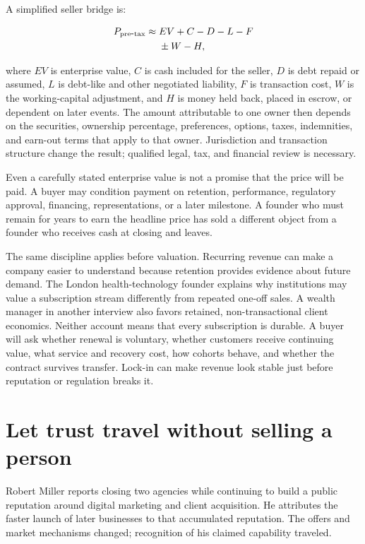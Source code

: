 A simplified seller bridge is:

\begin{align}
P_{\mathrm{pre\mbox{-}tax}} \approx{}& EV + C - D - L - F \notag\\
&{}\pm W - H,
\end{align}

where \(EV\) is enterprise value, \(C\) is cash included for the seller,
\(D\) is debt repaid or assumed, \(L\) is debt-like and other negotiated
liability, \(F\) is transaction cost, \(W\) is the working-capital adjustment,
and \(H\) is money held back, placed in escrow, or dependent on later events.
The amount attributable to one owner then depends on the securities, ownership
percentage, preferences, options, taxes, indemnities, and earn-out terms that
apply to that owner. Jurisdiction and transaction structure change the result;
qualified legal, tax, and financial review is necessary.

Even a carefully stated enterprise value is not a promise that the price will
be paid. A buyer may condition payment on retention, performance, regulatory
approval, financing, representations, or a later milestone. A founder who must
remain for years to earn the headline price has sold a different object from a
founder who receives cash at closing and leaves.

The same discipline applies before valuation. Recurring revenue can make a
company easier to understand because retention provides evidence about future
demand. The London health-technology founder explains why institutions may
value a subscription stream differently from repeated one-off sales. A wealth
manager in another interview also favors retained, non-transactional client
economics. Neither account means that every subscription is durable. A buyer
will ask whether renewal is voluntary, whether customers receive continuing
value, what service and recovery cost, how cohorts behave, and whether the
contract survives transfer. Lock-in can make revenue look stable just before
reputation or regulation breaks it.

\section{Let trust travel without selling a person}

Robert Miller reports closing two agencies while continuing to build a public
reputation around digital marketing and client acquisition. He attributes the
faster launch of later businesses to that accumulated reputation. The offers
and market mechanisms changed; recognition of his claimed capability traveled.

